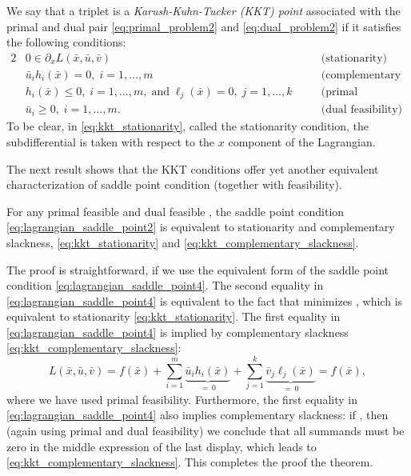 We say that a triplet  is a
\emph{Karush-Kuhn-Tucker (KKT) point} associated with the primal and 
dual pair \eqref{eq:primal_problem2} and \eqref{eq:dual_problem2} if it
satisfies the following conditions: 
\begin{alignat}{2}
\label{eq:kkt_stationarity}
&0 \in \partial_x L(\bar{x}, \bar{u}, \bar{v}) \quad
&& \text{(stationarity)} \\
\label{eq:kkt_complementary_slackness} 
&\bar{u}_i h_i(\bar{x}) = 0, \; i = 1,\dots,m \quad 
&& \text{(complementary slackness)} \\
\label{eq:kkt_primal_feasibility}
&h_i(\bar{x}) \leq 0, \; i = 1,\dots,m, \; \text{and} \; 
\ell_j(\bar{x}) = 0, \; j = 1,\dots,k \quad 
&& \text{(primal feasibility)} \\ 
\label{eq:kkt_dual_feasibility}
&\bar{u}_i \geq 0, \; i = 1,\dots,m. \quad
&& \text{(dual feasibility)}
\end{alignat}
To be clear, in \eqref{eq:kkt_stationarity}, called the stationarity condition,
the subdifferential is taken with respect to the $x$ component of the
Lagrangian.  

The next result shows that the KKT conditions offer yet another equivalent
characterization of saddle point condition (together with feasibility).  

\begin{Lemma}
\label{lem:saddle_point_kkt}
For any primal feasible  and dual feasible , the saddle point condition \eqref{eq:lagrangian_saddle_point2} is
equivalent to stationarity and complementary slackness,
\eqref{eq:kkt_stationarity} and \eqref{eq:kkt_complementary_slackness}.
\end{Lemma}

The proof is straightforward, if we use the equivalent form of the saddle point
condition \eqref{eq:lagrangian_saddle_point4}. The second equality in
\eqref{eq:lagrangian_saddle_point4} is equivalent to the fact that
 minimizes , which is
equivalent to stationarity \eqref{eq:kkt_stationarity}. The first equality in
\eqref{eq:lagrangian_saddle_point4} is implied by complementary slackness
\eqref{eq:kkt_complementary_slackness}:
\[
L(\bar{x}, \bar{u}, \bar{v}) = f(\bar{x}) + 
\sum_{i=1}^m \underbrace{\bar{u}_i h_i(\bar{x})}_{=\,0} + 
\sum_{j=1}^k \underbrace{\bar{v}_j \ell_j(\bar{x})}_{=\,0} 
= f(\bar{x}),
\]
where we have used primal feasibility. Furthermore, the first equality in
\eqref{eq:lagrangian_saddle_point4} also implies complementary slackness: if
, then (again using primal
and dual feasibility) we conclude that all summands must be zero in the middle
expression of the last display, which leads to
\eqref{eq:kkt_complementary_slackness}. This completes the proof the theorem.

